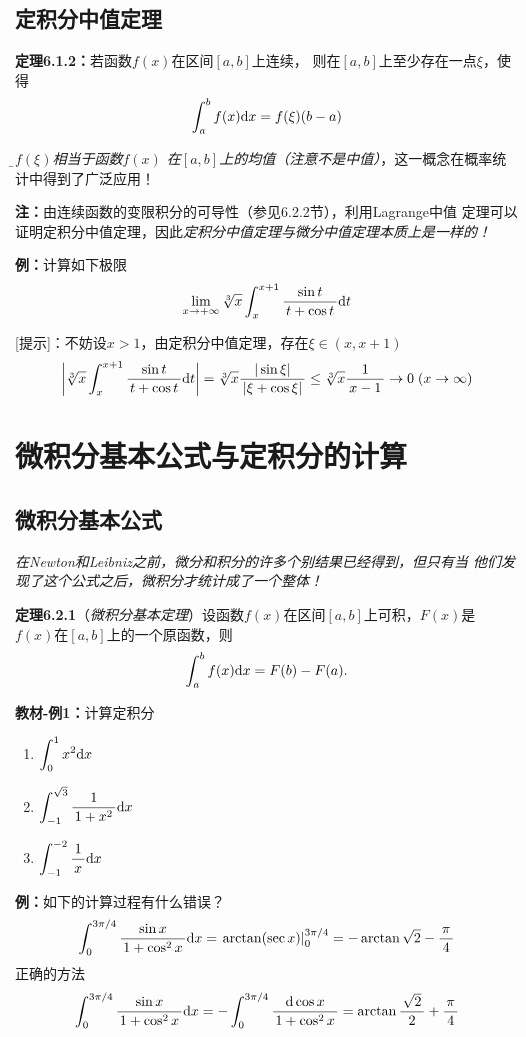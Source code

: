 \subsection{定积分中值定理}

{\bf 定理6.1.2：}若函数$f(x)$在区间$[a,b]$上连续，
则在$[a,b]$上至少存在一点$\xi$，使得
$$\displaystyle\int_a^bf(x)\mathrm{d} x=f(\xi)(b-a)$$

{\it\b $f(\xi)$相当于函数$f(x)$
在$[a,b]$上的均值（注意不是中值）}，这一概念在概率统计中得到了广泛应用！

{\bf 注：}由连续函数的变限积分的可导性（参见6.2.2节），利用Lagrange中值
定理可以证明定积分中值定理，因此{\it 定积分中值定理与微分中值定理本质上是一样的！}

{\bf 例：}计算如下极限
$$\lim\limits_{x\to{+\infty}}\sqrt[3]x\displaystyle\int_x^{x+1}\displaystyle\frac{\,{\sin t}\,}{\,{t+\cos t}\,}\mathrm{d} t$$

[提示]：不妨设$x>1$，由定积分中值定理，存在$\xi\in(x,x+1)$
$$\left|\sqrt[3]x\displaystyle\int_x^{x+1}\displaystyle\frac{\,{\sin t}\,}{\,{t+\cos t}\,}\mathrm{d} t\right|
=\sqrt[3]x\displaystyle\frac{\,{|\sin\xi|}\,}{\,{|\xi+\cos\xi|}\,}\leq\sqrt[3]x\displaystyle\frac{\,{1}\,}{\,{x-1}\,}
\to0\;(x\to\infty)$$


\section{微积分基本公式与定积分的计算}

\subsection{微积分基本公式}

{\it 在Newton和Leibniz之前，微分和积分的许多个别结果已经得到，但只有当
他们发现了这个公式之后，微积分才统计成了一个整体！}

{\bf 定理6.2.1}（{\it 微积分基本定理}）设函数$f(x)$在区间$[a,b]$上可积，$F(x)$是
$f(x)$在$[a,b]$上的一个原函数，则
$$\displaystyle\int_a^bf(x)\mathrm{d} x=F(b)-F(a).$$

{\bf 教材-例1：}计算定积分
\begin{enumerate}[(1)]
  \setlength{\itemindent}{1cm}
  \item $\displaystyle\int_{0}^{1}x^2 \mathrm{d} x$
  \item $\displaystyle\int_{-1}^{\sqrt 3}\displaystyle\frac{\,{1}\,}{\,{1+x^2}\,}\mathrm{d} x$
  \item $\displaystyle\int_{-1}^{-2}\displaystyle\frac{\,{1}\,}{\,{x}\,}\mathrm{d} x$
\end{enumerate}

{\bf 例：}如下的计算过程有什么错误？
$$\displaystyle\int_0^{3\pi/4}\displaystyle\frac{\,{\sin x}\,}{\,{1+\cos^2x}\,}\mathrm{d} x
=\left.\arctan(\sec x)\right|_0^{3\pi/4}=-\arctan\sqrt2-\displaystyle\frac{\,{\pi}\,}{\,{4}\,}$$
正确的方法
$$\displaystyle\int_0^{3\pi/4}\displaystyle\frac{\,{\sin x}\,}{\,{1+\cos^2x}\,}\mathrm{d} x
=-\displaystyle\int_0^{3\pi/4}\displaystyle\frac{\,{\mathrm{d}\cos x}\,}{\,{1+\cos^2x}\,}=\arctan\displaystyle\frac{\,{\sqrt2}\,}{\,{2}\,}
+\displaystyle\frac{\,{\pi}\,}{\,{4}\,}$$

